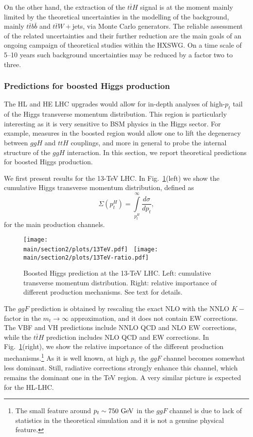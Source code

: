 On the other hand, the extraction of the $t \bar t H$ signal is at the moment mainly
limited by the theoretical uncertainties in the modelling of the background,
mainly $t\bar t b \bar b$ and $t \bar t W+$jets, via Monte Carlo generators. The reliable assessment of
the related uncertainties and their further reduction are the main goals of an
ongoing campaign of theoretical studies within the HXSWG. On a time scale of
5--10 years such background uncertainties may be reduced by a factor two to
three.

\subsubsection{Predictions for boosted Higgs production}
The HL and HE LHC upgrades would allow for in-depth analyses of high-$p_t$ tail of the Higgs
transverse momentum distribution. This region is particularly interesting as it is
very sensitive to BSM physics in the Higgs sector. For example, measures in the boosted region would 
allow one to lift the degeneracy between $ggH$ and $ttH$ couplings, and more in general to 
probe the internal structure of the $ggH$ interaction. In this section, we report theoretical
predictions for boosted Higgs production. 

We first present results for the 13-TeV LHC. In Fig.~\ref{fig:boosted13}(left) we show the cumulative Higgs 
transverse momentum distribution, defined as
$$
\Sigma(p_t^H) = \int\limits_{p_t^H}^{\infty} \frac{d\sigma}{d p_t},
$$
for the main production channels.
\begin{figure}[h]
\begin{center}
    \texttt{[image: \\main/section2/plots/13TeV.pdf]}~
    \texttt{[image: \\main/section2/plots/13TeV-ratio.pdf]}
    \caption{
    Boosted Higgs prediction at the 13-TeV LHC. Left: cumulative transverse momentum distribution.
    Right: relative importance of different production mechanisms. See text for details. 
        \label{fig:boosted13}}
        \end{center}
\end{figure}
The $ggF$ prediction is obtained by rescaling the exact NLO with the NNLO $K-$factor in the $m_t\to\infty$
approximation, and it does not contain EW corrections. The VBF and VH predictions include NNLO QCD
and NLO EW corrections, while the $t\bar t H$ prediction includes NLO QCD and EW corrections. In
Fig.~\ref{fig:boosted13}(right), we show the relative importance of the different production mechanisms.\footnote{
The small feature around $p_t\sim 750~{\rm GeV}$ in the $ggF$ channel is due to lack of statistics in the
theoretical simulation and it is not a genuine physical feature.}
As it is well known, at high $p_t$ the $ggF$ channel becomes somewhat less dominant. Still, radiative
corrections strongly enhance this channel, which remains the dominant one in the TeV region. A very similar picture is expected for the HL-LHC. 


